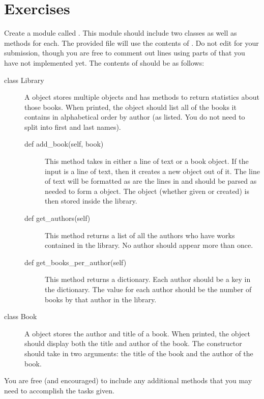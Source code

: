 \documentclass[11pt]{cselabheader}
\begin{document}
\clearpage
\section{Exercises}
\label{sec:ex}

\begin{ex}[library.py]
    Create a module called . This module should include
    two classes as well as methods for each. The provided file
     will use the contents of
    . Do not edit  for
    your submission, though you are free to comment out lines using parts of
     that you have not implemented yet. The contents of
     should be as follows:

    \begin{description}
    \item[class Library] A  object stores multiple
        objects and has methods to return statistics about those books. When
        printed, the object should list all of the books it contains in
        alphabetical order by author (as listed. You do not need to split into
        first and last names).
        \begin{description}
        \item[def add\_book(self, book)] This method takes in either a line of
            text or a book object. If the input is a line of text, then it
            creates a new  object out of it. The line of
            text will be formatted as are the lines in 
            and should be parsed as needed to form a  object.
            The object (whether given or created) is then stored inside the
            library.
        \item[def get\_authors(self)] This method returns a list of all the
            authors who have works contained in the library. No author should
            appear more than once.
        \item[def get\_books\_per\_author(self)] This method returns a
            dictionary.
            Each author should be a key in the dictionary. The value for each
            author should be the number of books by that author in the library.
        \end{description}
    \item[class Book] A  object stores the author and title
        of a book. When printed, the object should display both the title and
        author of the book. The constructor should take in two arguments:
        the title of the book and the author of the book.
    \end{description}

    You are free (and encouraged) to include any additional methods that you may
    need to accomplish the tasks given.
\end{ex}
\end{document}
